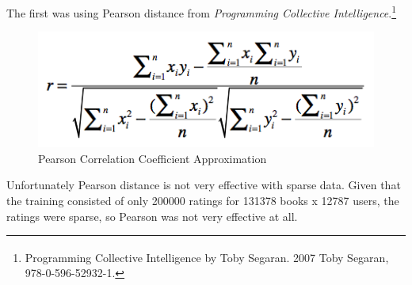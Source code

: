 \documentclass[11pt, oneside]{article}   	%
\begin{document}
The first was using Pearson distance from \emph{Programming Collective Intelligence}.\footnote{Programming Collective Intelligence by Toby Segaran. \textsuperscript{\textcopyright} 2007 Toby Segaran, 978-0-596-52932-1.}

\begin{figure}[h!]
\centering
\includegraphics[scale=0.6]{pearson}
\caption{Pearson Correlation Coefficient Approximation}
\end{figure}

Unfortunately Pearson distance is not very effective with sparse data. Given that the training consisted of only 200000 ratings for 131378 books x 12787 users, the ratings were sparse, so Pearson was not very effective at all.
\end{document}
